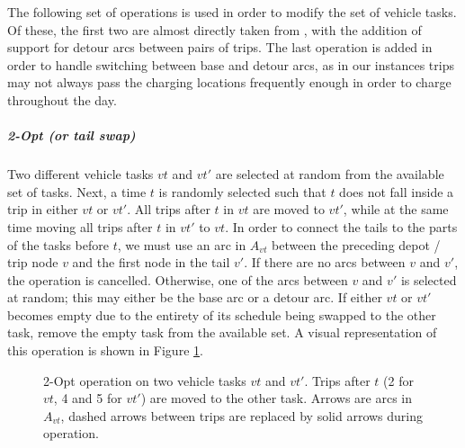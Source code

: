 \documentclass[]{article}
\begin{document}
The following set of operations is used in order to modify the set of vehicle tasks. Of these, the first two are almost directly taken from \citet{Bosch21}, with the addition of support for detour arcs between pairs of trips. The last operation is added in order to handle switching between base and detour arcs, as in our instances trips may not always pass the charging locations frequently enough in order to charge throughout the day.

\noindent\subparagraph{2-Opt (or tail swap)}  Two different vehicle tasks $vt$ and $vt'$ are selected at random from the available set of tasks. Next, a time $t$ is randomly selected such that $t$ does not fall inside a trip in either $vt$ or $vt'$. All trips after $t$ in $vt$ are moved to $vt'$, while at the same time moving all trips after $t$ in $vt'$ to $vt$. In order to connect the tails to the parts of the tasks before $t$, we must use an arc in $A_{vt}$ between the preceding depot / trip node $v$ and the first node in the tail $v'$. If there are no arcs between $v$ and $v'$, the operation is cancelled. Otherwise, one of the arcs between $v$ and $v'$ is selected at random; this may either be the base arc or a detour arc. If either $vt$ or $vt'$ becomes empty due to the entirety of its schedule being swapped to the other task, remove the empty task from the available set. A visual representation of this operation is shown in Figure \ref{fig:2opt-vt}.
\begin{figure}[H]
  \centering
  \caption{2-Opt operation on two vehicle tasks $vt$ and $vt'$. Trips after $t$ (2 for $vt$, 4 and 5 for $vt'$) are moved to the other task. Arrows are arcs in $A_{vt}$, dashed arrows between trips are replaced by solid arrows during operation.}
  \label{fig:2opt-vt}
\end{figure}
\end{document}
